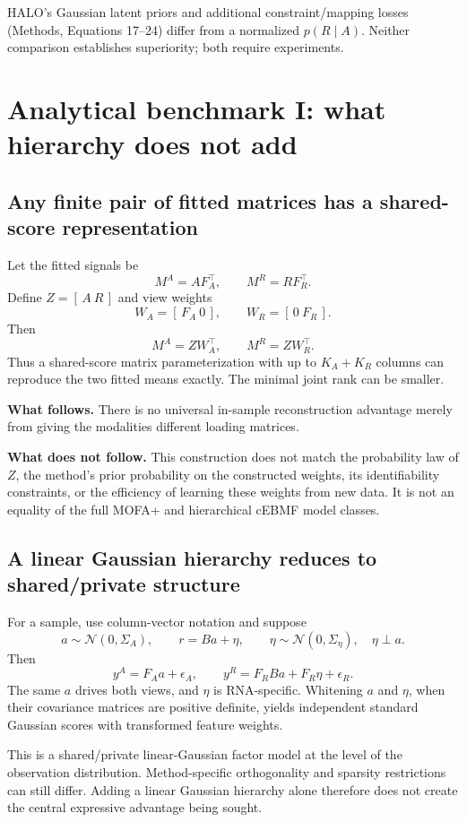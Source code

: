 \documentclass[11pt,a4paper]{article}
\newcommand{\N}{\mathcal N}
\numberwithin{equation}{section}
\begin{document}
HALO's Gaussian latent priors and additional constraint/mapping losses
(Methods, Equations 17--24) differ from a normalized \(p(R\mid A)\).
Neither comparison establishes superiority; both require experiments.

\clearpage
\section{Analytical benchmark I: what hierarchy does not add}

\subsection{Any finite pair of fitted matrices has a shared-score representation}
Let the fitted signals be
\[
M^A=AF_A^\top,\qquad M^R=RF_R^\top.
\]
Define \(Z=[\,A\ R\,]\) and view weights
\[
W_A=[\,F_A\ 0\,],\qquad W_R=[\,0\ F_R\,].
\]
Then
\begin{equation}
M^A=ZW_A^\top,\qquad M^R=ZW_R^\top.
\end{equation}
Thus a shared-score matrix parameterization with up to \(K_A+K_R\)
columns can reproduce the two fitted means exactly.
The minimal joint rank can be smaller.

\textbf{What follows.} There is no universal in-sample reconstruction
advantage merely from giving the modalities different loading matrices.

\textbf{What does not follow.} This construction does not match the
probability law of \(Z\), the method's prior probability on the constructed
weights, its identifiability constraints, or the efficiency of learning
these weights from new data. It is not an equality of the full MOFA+
and hierarchical cEBMF model classes.

\subsection{A linear Gaussian hierarchy reduces to shared/private structure}
For a sample, use column-vector notation and suppose
\[
a\sim\N(0,\Sigma_A),\qquad
r=B a+\eta,\qquad \eta\sim\N(0,\Sigma_\eta),\quad \eta\perp a.
\]
Then
\[
y^A=F_Aa+\epsilon_A,\qquad
y^R=F_RB a+F_R\eta+\epsilon_R.
\]
The same \(a\) drives both views, and \(\eta\) is RNA-specific.
Whitening \(a\) and \(\eta\), when their covariance matrices are
positive definite, yields independent standard Gaussian scores with
transformed feature weights.

This is a shared/private linear-Gaussian factor model at the level of the
observation distribution. Method-specific orthogonality and sparsity
restrictions can still differ. Adding a linear Gaussian hierarchy alone
therefore does not create the central expressive advantage being sought.
\end{document}
